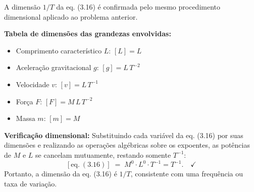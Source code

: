 A dimensão $1/T$ da eq. (3.16) é confirmada pelo mesmo procedimento dimensional aplicado ao problema anterior.

\textbf{Tabela de dimensões das grandezas envolvidas:}
\begin{itemize}
\item Comprimento característico $L$: $[L] = L$
\item Aceleração gravitacional $g$: $[g] = L\,T^{-2}$
\item Velocidade $v$: $[v] = L\,T^{-1}$
\item Força $F$: $[F] = M\,L\,T^{-2}$
\item Massa $m$: $[m] = M$
\end{itemize}

\textbf{Verificação dimensional:}
Substituindo cada variável da eq. (3.16) por suas dimensões e realizando as operações algébricas sobre os expoentes, as potências de $M$ e $L$ se cancelam mutuamente, restando somente $T^{-1}$:
\[
[\text{eq.}\ (3.16)]\;=\; M^0 \cdot L^0 \cdot T^{-1} = T^{-1}.\quad\checkmark
\]
Portanto, a dimensão da eq. (3.16) é $\boxed{1/T}$, consistente com uma frequência ou taxa de variação.

